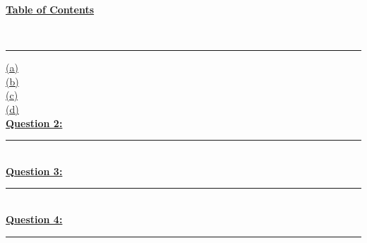 \documentclass[12pt]{article}
\begin{document}
\begin{center}
    \hypertarget{toc}{\LARGE \noindent \underline{\textbf{Table of Contents}}}\\
\end{center}

\vspace{1mm}
\hrule
\vspace{1mm}
\noindent
\hyperlink{1.1}{(a)}\\
\hyperlink{1.2}{(b)}\\
\hyperlink{1.3}{(c)}\\
\hyperlink{1.4}{(d)}\\

\noindent \hyperlink{2}{\textbf{Question 2:}}
\vspace{1mm}
\hrule
\vspace{1mm} \leavevmode \\

\noindent \hyperlink{3}{\textbf{Question 3:}}
\vspace{1mm}
\hrule
\vspace{1mm} \leavevmode \\

\noindent \hyperlink{4}{\textbf{Question 4:}}
\vspace{1mm}
\hrule
\vspace{1mm} \leavevmode \\

\newpage
\end{document}
